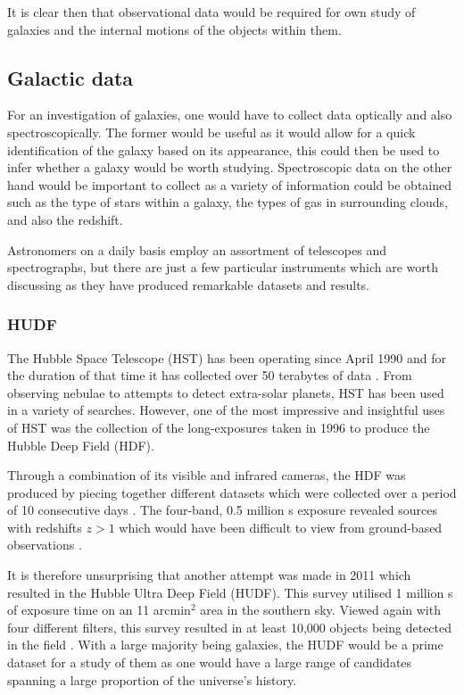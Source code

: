 \documentclass[12pt, twocolumn]{revtex4}    %
\begin{document}
It is clear then that observational data would be required for own study of galaxies and the internal motions of the objects within them. 

\subsection{Galactic data} 

For an investigation of galaxies, one would have to collect data optically and also spectroscopically. The former would be useful as it would allow for a quick identification of the galaxy based on its appearance, this could then be used to infer whether a galaxy would be worth studying. Spectroscopic data on the other hand would be important to collect as a variety of information could be obtained such as the type of stars within a galaxy, the types of gas in surrounding clouds, and also the redshift. 

Astronomers on a daily basis employ an assortment of telescopes and spectrographs, but there are just a few particular instruments which are worth discussing as they have produced remarkable datasets and results.

\subsubsection{HUDF}

The Hubble Space Telescope (HST) has been operating since April 1990 and for the duration of that time it has collected over 50 terabytes of data \cite{mccoy_space_sciences}. From observing nebulae to attempts to detect extra-solar planets, HST has been used in a variety of searches. However, one of the most impressive and insightful uses of HST was the collection of the long-exposures taken in 1996 to produce the Hubble Deep Field (HDF). 

Through a combination of its visible and infrared cameras, the HDF was produced by piecing together different datasets which were collected over a period of 10 consecutive days \cite{mccoy_space_sciences, williams_hdp}. The four-band, 0.5 million s exposure revealed sources with redshifts $z>1$ which would have been difficult to view from ground-based observations \cite{beckwith_hudf}. 


It is therefore unsurprising that another attempt was made in 2011 which resulted in the Hubble Ultra Deep Field (HUDF). This survey utilised 1 million s of exposure time on an 11 arcmin$^2$ area in the southern sky. Viewed again with four different filters, this survey resulted in at least 10,000 objects being detected in the field \cite{beckwith_hudf}. With a large majority being galaxies, the HUDF would be a prime dataset for a study of them as one would have a large range of candidates spanning a large proportion of the universe's history. 
\end{document}
